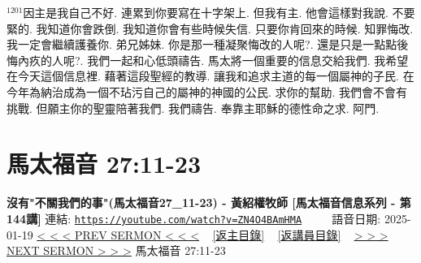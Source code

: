 \documentclass{book}
\begin{document}
$^{1201}$因主是我自己不好.
連累到你要寫在十字架上.
但我有主.
他會這樣對我說.
不要緊的.
我知道你會跌倒.
我知道你會有些時候失信.
只要你肯回來的時候.
知罪悔改.
我一定會繼續護養你.
弟兄姊妹.
你是那一種凝聚悔改的人呢?.
還是只是一點點後悔內疚的人呢?.
我們一起和心低頭禱告.
馬太將一個重要的信息交給我們.
我希望在今天這個信息裡.
藉著這段聖經的教導.
讓我和追求主道的每一個屬神的子民.
在今年為納治成為一個不玷污自己的屬神的神國的公民.
求你的幫助.
我們會不會有挑戰.
但願主你的聖靈陪著我們.
我們禱告.
奉靠主耶穌的德性命之求.
阿門.
\newpage



\section{馬太福音 27:11-23}
\label{sec:ZN4O4BAmHMA}
\textbf{沒有"不關我們的事"(馬太福音27\_11-23) -  黃紹權牧師 [馬太福音信息系列 - 第144講]}
\newline
\newline
連結: \href{https://youtube.com/watch?v=ZN4O4BAmHMA}{\texttt{https://youtube.com/watch?v=ZN4O4BAmHMA}} ~~~~ 語音日期: 2025-01-19
\newline
\newline
\hyperref[sec:499K9je19EI]{< < < PREV SERMON < < <}
~
\hyperlink{toc}{[返主目錄]}
~
\hyperref[ch:preacher18]{[返講員目錄]}
~
\hyperref[sec:HaaLhKYBRSg]{> > > NEXT SERMON > > >}
\newline
\newline
馬太福音 27:11-23
\newline
\end{document}
